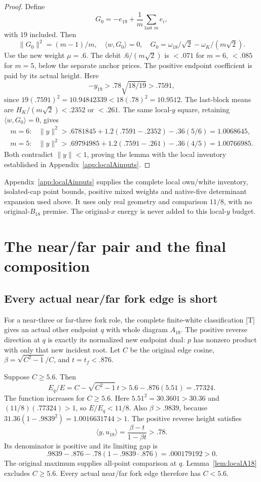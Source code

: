 \documentclass[11pt]{article}
\theoremstyle{definition}
\theoremstyle{remark}
\newcommand{\ip}[2]{\langle #1,#2\rangle}
\newcommand{\norm}[1]{\lVert #1\rVert}
\newcommand{\src}[1]{\textnormal{\textsf{[#1]}}}
\begin{document}
\begin{proof}
Define
\[
 G_0=-e_{19}+\frac1m\sum_{\text{last }m}e_i,
\]
with \(19\) included. Then
\[
 \norm{G_0}^2=(m-1)/m,\quad \ip{w}{G_0}=0,\quad
 G_0=\omega_{18}/\sqrt2-\omega_K/(m\sqrt2).
\]
Use the new weight \(\mu=.6\).
The debit \(.6/(m\sqrt2)\) is \(<.071\) for \(m=6\),
\(<.085\) for \(m=5\), below the separate anchor prices.
The positive endpoint coefficient is paid by its actual height.
Here
\[
 -y_{19}>.78\sqrt{18/19}>.7591,
\]
since \(19(.7591)^2=10.94842339<18(.78)^2=10.9512\).
The last-block means are
\(H_K/(m\sqrt2)<.2352\) or \(<.261\).
The same local-\(y\) square, retaining \(\ip{w}{G_0}=0\), gives
\[
\begin{array}{ll}
m=6:&\norm{y}^2>
 .6781845+1.2(.7591-.2352)-.36(5/6)=1.0068645,\\
m=5:&\norm{y}^2>
 .69794985+1.2(.7591-.261)-.36(4/5)=1.00766985.
\end{array}
\]
Both contradict \(\norm{y}<1\), proving the lemma with the
local inventory established in Appendix~\ref{app:localAinputs}.
\end{proof}
Appendix~\ref{app:localAinputs} supplies the complete
local own/white inventory, isolated-cap point bounds,
positive mixed weights and native-five determinant
expansion used above. It uses only real geometry and
comparison \(11/8\), with no original-\(B_{18}\) premise.
The original-\(x\) energy is never added to this local-\(y\) budget.

\section{The near/far pair and the final composition}
\label{sec:composition}
\subsection{Every actual near/far fork edge is short}
For a near-three or far-three fork role, the complete finite-white
classification \src{T} gives an actual other endpoint \(q\)
with whole diagram \(A_{18}\). The positive reverse direction
at \(q\) is exactly its normalized new endpoint dual: \(p\)
has nonzero product with only that new incident root.
Let \(C\) be the original edge cosine,
\(\beta=\sqrt{C^2-1}/C\), and \(t=t_f<.876\).

Suppose \(C\geq5.6\). Then
\[
 E_q/E=C-\sqrt{C^2-1}\,t
       >5.6-.876(5.51)=.77324.
\]
The function increases for \(C\geq5.6\).
Here \(5.51^2=30.3601>30.36\) and
\((11/8)(.77324)>1\), so \(E/E_q<11/8\).
Also \(\beta>.9839\), because
\(31.36(1-.9839^2)=1.0016631744>1\).
The positive reverse height satisfies
\[
 \ip{y}{u_{18}}=\frac{\beta-t}{1-\beta t}>.78.
\]
Its denominator is positive and its limiting gap is
\[
 .9839-.876-.78(1-.9839\cdot.876)=.000179192>0.
\]
The original maximum supplies all-point comparison at \(q\).
Lemma~\ref{lem:localA18} excludes \(C\geq5.6\).
Every actual near/far fork edge therefore has \(C<5.6\).
\end{document}
